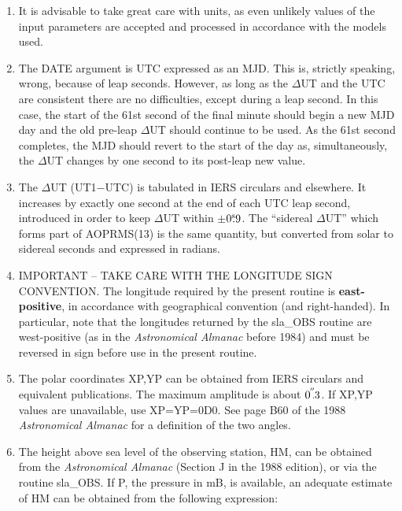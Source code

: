 \documentclass[11pt,twoside]{article}
\newcommand{\arcsec}[2] {\arcseci{#1}$\hspace{-0.4em}.#2$}
\newcommand{\arcsec}[2] {
      {$#1\hspace{-0.05em}^{'\hspace{-0.1em}'}\hspace{-0.4em}.#2$}
   }
\newcommand{\arcseci}[1] {$#1\hspace{-0.05em}$\raisebox{-0.5ex}
                         {$^{'\hspace{-0.1em}'}$}}
\renewcommand{\arcseci}[1] {$#1\hspace{-0.05em}^{'\hspace{-0.1em}'}$}
\newcommand{\tseci}[1]   {$#1$\mbox{$^{\rm s}$}}
\newcommand{\tsec}[2]    {\tseci{#1}$\hspace{-0.3em}.#2$}
\renewcommand{\tsec}[2] {$#1^{\rm s}\hspace{-0.3em}.#2$}
\begin{document}
{
 \begin{enumerate}
  \item It is advisable to take great care with units, as even
        unlikely values of the input parameters are accepted and
        processed in accordance with the models used.
  \item The DATE argument is UTC expressed as an MJD.  This is,
        strictly speaking, wrong, because of leap seconds.  However,
        as long as the $\Delta$UT and the UTC are consistent there
        are no difficulties, except during a leap second.  In this
        case, the start of the 61st second of the final minute should
        begin a new MJD day and the old pre-leap $\Delta$UT should
        continue to be used.  As the 61st second completes, the MJD
        should revert to the start of the day as, simultaneously,
        the $\Delta$UT changes by one second to its post-leap new value.
  \item The $\Delta$UT (UT1$-$UTC) is tabulated in IERS circulars and
        elsewhere.  It increases by exactly one second at the end of
        each UTC leap second, introduced in order to keep $\Delta$UT
        within $\pm$\tsec{0}{9}.  The ``sidereal $\Delta$UT'' which forms
        part of AOPRMS(13) is the same quantity, but converted from solar
        to sidereal seconds and expressed in radians.
  \item IMPORTANT -- TAKE CARE WITH THE LONGITUDE SIGN CONVENTION.  The
        longitude required by the present routine is {\bf east-positive},
        in accordance with geographical convention (and right-handed).
        In particular, note that the longitudes returned by the
        sla\_OBS routine are west-positive (as in the {\it Astronomical
        Almanac}\/ before 1984) and must be reversed in sign before use in
        the present routine.
  \item The polar coordinates XP,YP can be obtained from IERS
        circulars and equivalent publications.  The
        maximum amplitude is about \arcsec{0}{3}.  If XP,YP values
        are unavailable, use XP=YP=0D0.  See page B60 of the 1988
        {\it Astronomical Almanac}\/ for a definition of the two angles.
  \item The height above sea level of the observing station, HM,
        can be obtained from the {\it Astronomical Almanac}\/ (Section J
        in the 1988 edition), or via the routine sla\_OBS.  If P,
        the pressure in mB, is available, an adequate
        estimate of HM can be obtained from the following expression:

\end{enumerate}}
\end{document}

